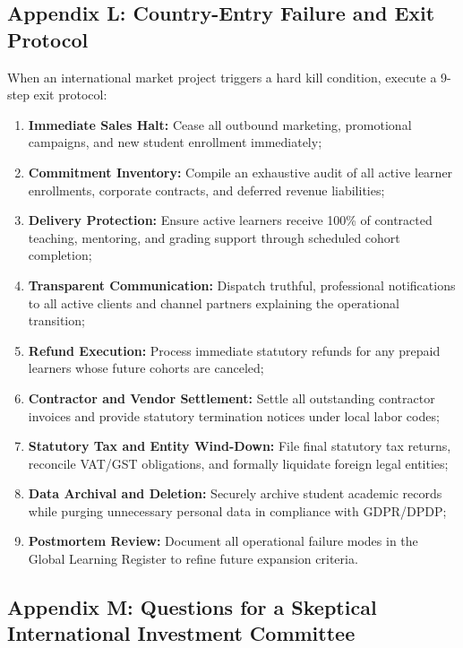 \subsection{Appendix L: Country-Entry Failure and Exit Protocol}

When an international market project triggers a hard kill condition, execute a 9-step exit protocol:
\begin{enumerate}
    \item \textbf{Immediate Sales Halt:} Cease all outbound marketing, promotional campaigns, and new student enrollment immediately;
    \item \textbf{Commitment Inventory:} Compile an exhaustive audit of all active learner enrollments, corporate contracts, and deferred revenue liabilities;
    \item \textbf{Delivery Protection:} Ensure active learners receive 100\% of contracted teaching, mentoring, and grading support through scheduled cohort completion;
    \item \textbf{Transparent Communication:} Dispatch truthful, professional notifications to all active clients and channel partners explaining the operational transition;
    \item \textbf{Refund Execution:} Process immediate statutory refunds for any prepaid learners whose future cohorts are canceled;
    \item \textbf{Contractor and Vendor Settlement:} Settle all outstanding contractor invoices and provide statutory termination notices under local labor codes;
    \item \textbf{Statutory Tax and Entity Wind-Down:} File final statutory tax returns, reconcile VAT/GST obligations, and formally liquidate foreign legal entities;
    \item \textbf{Data Archival and Deletion:} Securely archive student academic records while purging unnecessary personal data in compliance with GDPR/DPDP;
    \item \textbf{Postmortem Review:} Document all operational failure modes in the Global Learning Register to refine future expansion criteria.
\end{enumerate}

\subsection{Appendix M: Questions for a Skeptical International Investment Committee}

